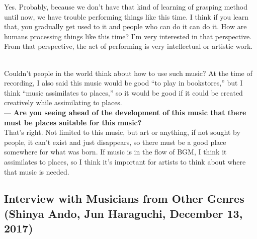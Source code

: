 \begin{description}
Yes. Probably, because we don't have that kind of learning of grasping method until now, we have trouble performing things like this time. I think if you learn that, you gradually get used to it and people who can do it can do it. How are humans processing things like this time? I'm very interested in that perspective. From that perspective, the act of performing is very intellectual or artistic work.\\

\item [How do you think about the development potential of this work and method?]\mbox{}\\

Couldn't people in the world think about how to use such music? At the time of recording, I also said this music would be good ``to play in bookstores,'' but I think ``music assimilates to places,'' so it would be good if it could be created creatively while assimilating to places.\\

--- {\bf Are you seeing ahead of the development of this music that there must be places suitable for this music?}\\

That's right. Not limited to this music, but art or anything, if not sought by people, it can't exist and just disappears, so there must be a good place somewhere for what was born. If music is in the flow of BGM, I think it assimilates to places, so I think it's important for artists to think about where that music is needed.
\end{description}

\subsection{Interview with Musicians from Other Genres (Shinya Ando, Jun Haraguchi, December 13, 2017)}

